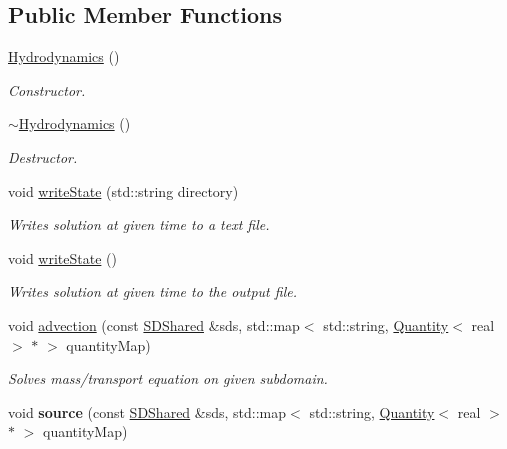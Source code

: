 \subsection*{Public Member Functions}
\begin{DoxyCompactItemize}
\item 
\mbox{\label{classHydrodynamics_a2587e06f872913791222ce0df5d713a4}} 
\hyperlink{classHydrodynamics_a2587e06f872913791222ce0df5d713a4}{Hydrodynamics} ()
\begin{DoxyCompactList}\small\item\em Constructor. \end{DoxyCompactList}\item 
\mbox{\label{classHydrodynamics_a76c14a1067c3d945384047e282b1d486}} 
\hyperlink{classHydrodynamics_a76c14a1067c3d945384047e282b1d486}{$\sim$\+Hydrodynamics} ()
\begin{DoxyCompactList}\small\item\em Destructor. \end{DoxyCompactList}\item 
void \hyperlink{classHydrodynamics_a3c0d39e9aff57c14ae919f7cbc6a2881}{write\+State} (std\+::string directory)
\begin{DoxyCompactList}\small\item\em Writes solution at given time to a text file. \end{DoxyCompactList}\item 
void \hyperlink{classHydrodynamics_ab281cb2f11cc03bfdc87f52876ca2f8b}{write\+State} ()
\begin{DoxyCompactList}\small\item\em Writes solution at given time to the output file. \end{DoxyCompactList}\item 
void \hyperlink{classHydrodynamics_a7d465b65ae01b26029a173af8e7b8f73}{advection} (const \hyperlink{classSDShared}{S\+D\+Shared} \&sds, std\+::map$<$ std\+::string, \hyperlink{classQuantity}{Quantity}$<$ real $>$ $\ast$ $>$ quantity\+Map)
\begin{DoxyCompactList}\small\item\em Solves mass/transport equation on given subdomain. \end{DoxyCompactList}\item 
\mbox{\label{classHydrodynamics_aaad870fe38d582eb0e2df65535414b7a}} 
void {\bfseries source} (const \hyperlink{classSDShared}{S\+D\+Shared} \&sds, std\+::map$<$ std\+::string, \hyperlink{classQuantity}{Quantity}$<$ real $>$ $\ast$ $>$ quantity\+Map)
\end{DoxyCompactItemize}
